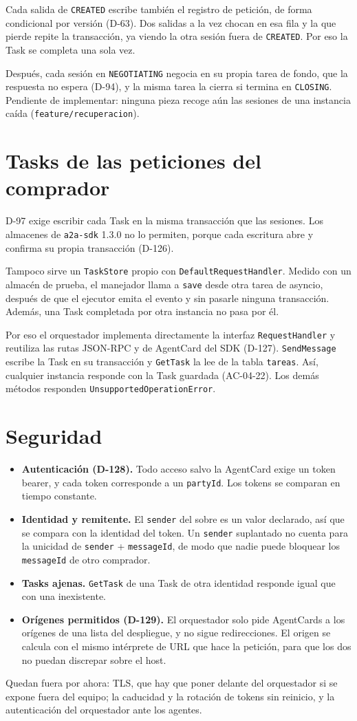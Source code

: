 Cada salida de \texttt{CREATED} escribe también el registro de petición, de forma condicional por versión (D-63). Dos salidas a la vez chocan en esa fila y la que pierde repite la transacción, ya viendo la otra sesión fuera de \texttt{CREATED}. Por eso la Task se completa una sola vez.

Después, cada sesión en \texttt{NEGOTIATING} negocia en su propia tarea de fondo, que la respuesta no espera (D-94), y la misma tarea la cierra si termina en \texttt{CLOSING}. Pendiente de implementar: ninguna pieza recoge aún las sesiones de una instancia caída (\texttt{feature/recuperacion}).

\section{Tasks de las peticiones del comprador}

D-97 exige escribir cada Task en la misma transacción que las sesiones. Los almacenes de \texttt{a2a-sdk} 1.3.0 no lo permiten, porque cada escritura abre y confirma su propia transacción (D-126).

Tampoco sirve un \texttt{TaskStore} propio con \texttt{DefaultRequestHandler}. Medido con un almacén de prueba, el manejador llama a \texttt{save} desde otra tarea de asyncio, después de que el ejecutor emita el evento y sin pasarle ninguna transacción. Además, una Task completada por otra instancia no pasa por él.

Por eso el orquestador implementa directamente la interfaz \texttt{RequestHandler} y reutiliza las rutas JSON-RPC y de AgentCard del SDK (D-127). \texttt{SendMessage} escribe la Task en su transacción y \texttt{GetTask} la lee de la tabla \texttt{tareas}. Así, cualquier instancia responde con la Task guardada (AC-04-22). Los demás métodos responden \texttt{UnsupportedOperationError}.

\section{Seguridad}

\begin{itemize}
  \item \textbf{Autenticación (D-128).} Todo acceso salvo la AgentCard exige un token bearer, y cada token corresponde a un \texttt{partyId}. Los tokens se comparan en tiempo constante.
  \item \textbf{Identidad y remitente.} El \texttt{sender} del sobre es un valor declarado, así que se compara con la identidad del token. Un \texttt{sender} suplantado no cuenta para la unicidad de \texttt{sender} + \texttt{messageId}, de modo que nadie puede bloquear los \texttt{messageId} de otro comprador.
  \item \textbf{Tasks ajenas.} \texttt{GetTask} de una Task de otra identidad responde igual que con una inexistente.
  \item \textbf{Orígenes permitidos (D-129).} El orquestador solo pide AgentCards a los orígenes de una lista del despliegue, y no sigue redirecciones. El origen se calcula con el mismo intérprete de URL que hace la petición, para que los dos no puedan discrepar sobre el host.
\end{itemize}

Quedan fuera por ahora: TLS, que hay que poner delante del orquestador si se expone fuera del equipo; la caducidad y la rotación de tokens sin reinicio, y la autenticación del orquestador ante los agentes.
